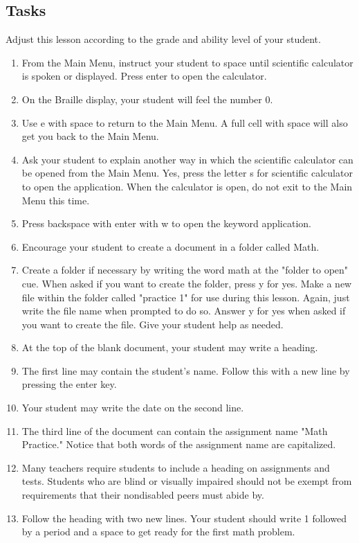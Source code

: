 \documentclass[10pt,letterpaper,twoside]{report}
\begin{document}
{{{\subsection{Tasks}
Adjust this lesson according to the grade and ability level of your student.
\begin{enumerate}
	\item From the Main Menu, instruct your student to space until scientific calculator is spoken or displayed.  Press enter to open the calculator.
	\item On the Braille display, your student will feel the number 0.
	\item Use e with space to return to the Main Menu.  A full cell with space will also get you back to the Main Menu.
	\item Ask your student to explain another way in which the scientific calculator can be opened from the Main Menu.  Yes, press the letter s for scientific calculator to open the application.  When the calculator is open, do not exit to the Main Menu this time.
	\item Press backspace with enter with w to open the keyword application.
	\item Encourage your student to create a document in a folder called Math.
	\item Create a folder if necessary by writing the word math at the "folder to open" cue.  When asked if you want to create the folder, press y for yes.  Make a new file within the folder called "practice 1" for use during this lesson.  Again, just write the file name when prompted to do so.  Answer y for yes when asked if you want to create the file.  Give your student help as needed.
	\item At the top of the blank document, your student may write a heading.
	\item The first line may contain the student's name.  Follow this with a new line by pressing the enter key.
	\item Your student may write the date on the second line.
	\item The third line of the document can contain the assignment name "Math Practice." Notice that both words of the assignment name are capitalized.
	\item Many teachers require students to include a heading on assignments and tests.  Students who are blind or visually impaired should not be exempt from requirements that their nondisabled peers must abide by.
	\item Follow the heading with two new lines.  Your student should write 1 followed by a period and a space to get ready for the first math problem.

\end{enumerate}}}}
\end{document}
